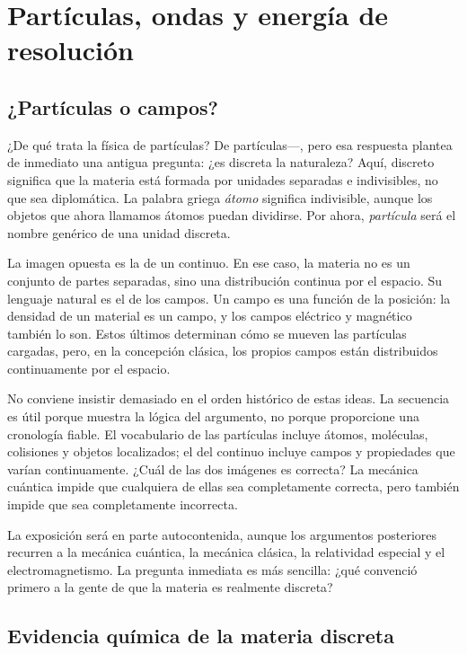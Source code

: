 \chapter{Partículas, ondas y energía de resolución}

\section{¿Partículas o campos?}

¿De qué trata la física de partículas? De partículas---, pero esa respuesta plantea de inmediato una antigua pregunta: ¿es discreta la naturaleza? Aquí, discreto significa que la materia está formada por unidades separadas e indivisibles, no que sea diplomática. La palabra griega \emph{átomo} significa indivisible, aunque los objetos que ahora llamamos átomos puedan dividirse. Por ahora, \emph{partícula} será el nombre genérico de una unidad discreta.

La imagen opuesta es la de un continuo. En ese caso, la materia no es un conjunto de partes separadas, sino una distribución continua por el espacio. Su lenguaje natural es el de los campos. Un campo es una función de la posición: la densidad de un material es un campo, y los campos eléctrico y magnético también lo son. Estos últimos determinan cómo se mueven las partículas cargadas, pero, en la concepción clásica, los propios campos están distribuidos continuamente por el espacio.

No conviene insistir demasiado en el orden histórico de estas ideas. La secuencia es útil porque muestra la lógica del argumento, no porque proporcione una cronología fiable. El vocabulario de las partículas incluye átomos, moléculas, colisiones y objetos localizados; el del continuo incluye campos y propiedades que varían continuamente. ¿Cuál de las dos imágenes es correcta? La mecánica cuántica impide que cualquiera de ellas sea completamente correcta, pero también impide que sea completamente incorrecta.

La exposición será en parte autocontenida, aunque los argumentos posteriores recurren a la mecánica cuántica, la mecánica clásica, la relatividad especial y el electromagnetismo. La pregunta inmediata es más sencilla: ¿qué convenció primero a la gente de que la materia es realmente discreta?

\section{Evidencia química de la materia discreta}

